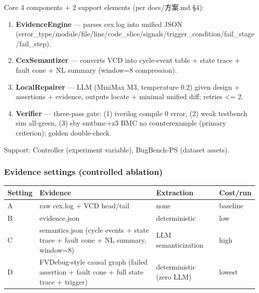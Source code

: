 \documentclass[
  11pt,
]{article}
\newcounter{none} %
\providecommand{\tightlist}{%
  \setlength{\itemsep}{0pt}\setlength{\parskip}{0pt}}
\begin{document}
Core 4 components + 2 support elements (per docs/方案.md §4):

\begin{enumerate}
\def\labelenumi{\arabic{enumi}.}
\tightlist
\item
  \textbf{EvidenceEngine} --- parses cex.log into unified JSON (error\_type/module/file/line/code\_slice/signals/trigger\_condition/fail\_stage/fail\_step).
\item
  \textbf{CexSemantizer} --- converts VCD into cycle-event table + state trace + fault cone + NL summary (window=8 compression).
\item
  \textbf{LocalRepairer} --- LLM (MiniMax M3, temperature 0.2) given design + assertions + evidence, outputs locate + minimal unified diff; retries \textless= 2.
\item
  \textbf{Verifier} --- three-pass gate: (1) iverilog compile 0 error, (2) weak testbench sim all-green, (3) sby smtbmc+z3 BMC no counterexample (primary criterion); golden double-check.
\end{enumerate}

Support: Controller (experiment variable), BugBench-PS (dataset assets).

\subsubsection{Evidence settings (controlled ablation)}\label{evidence-settings-controlled-ablation}

{\def\LTcaptype{none} %
\begin{longtable}[]{@{}
  >{\raggedright\arraybackslash}p{}
  >{\raggedright\arraybackslash}p{}
  >{\raggedright\arraybackslash}p{}
  >{\raggedright\arraybackslash}p{}@{}}
\toprule\noalign{}
\begin{minipage}[b]{\linewidth}\raggedright
Setting
\end{minipage} & \begin{minipage}[b]{\linewidth}\raggedright
Evidence
\end{minipage} & \begin{minipage}[b]{\linewidth}\raggedright
Extraction
\end{minipage} & \begin{minipage}[b]{\linewidth}\raggedright
Cost/run
\end{minipage} \\
\midrule\noalign{}
\endhead
\bottomrule\noalign{}
\endlastfoot
A & raw cex.log + VCD head/tail & none & baseline \\
B & evidence.json & deterministic & low \\
C & semantics.json (cycle events + state trace + fault cone + NL summary, window=8) & LLM semanticization & high \\
D & FVDebug-style causal graph (failed assertion + fault cone + full state trace + trigger) & deterministic (zero LLM) & lowest \\
\end{longtable}
}
\end{document}

